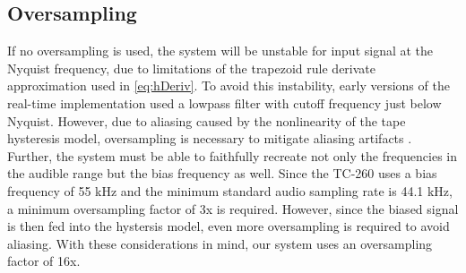 \documentclass[twoside,a4paper]{article}
\begin{document}
%
\subsection{Oversampling}
If no oversampling is used, the system will be unstable
for input signal at the Nyquist frequency, due to limitations
of the trapezoid rule derivate approximation used in \cref{eq:hDeriv}.
To avoid this instability, early versions of the real-time
implementation used a lowpass filter with cutoff frequency
just below Nyquist. However, due to aliasing caused by the
nonlinearity of the tape hysteresis model, oversampling is
necessary to mitigate aliasing artifacts \cite{Yeh}. Further,
the system must be able to faithfully recreate not only the
frequencies in the audible range but the bias frequency as
well. Since the TC-260 uses a bias frequency of 55 kHz \cite{RefManual}
and the minimum standard audio sampling rate is 44.1 kHz,
a minimum oversampling factor of 3x is required. However,
since the biased signal is then fed into the hystersis model,
even more oversampling is required to avoid aliasing. With these
considerations in mind, our system uses an oversampling
factor of 16x.

\end{document}
